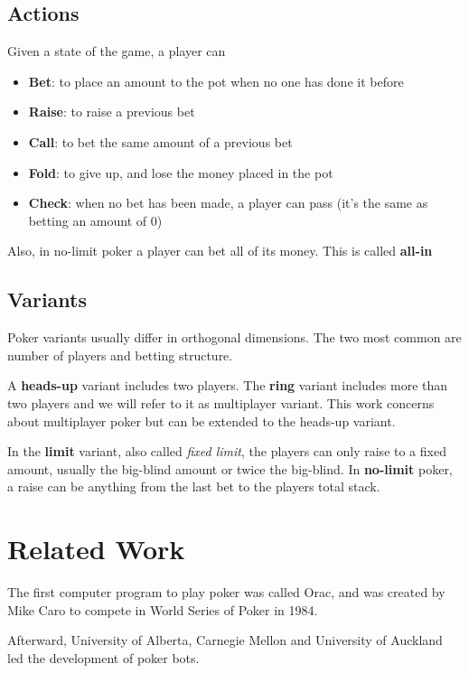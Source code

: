 \subsection{Actions}

Given a state of the game, a player can

\begin{itemize}
  \item \textbf{Bet}: to place an amount to the pot when no one has done it before
  \item \textbf{Raise}: to raise a previous bet
  \item \textbf{Call}: to bet the same amount of a previous bet
  \item \textbf{Fold}: to give up, and lose the money placed in the pot
  \item \textbf{Check}: when no bet has been made, a player can pass (it's the same as betting an amount of 0)
\end{itemize}

Also, in no-limit poker a player can bet all of its money. This is called \textbf{all-in}

\subsection{Variants}
Poker variants usually differ in orthogonal dimensions. The two most common are number of players and betting structure.

A \textbf{heads-up} variant includes two players. The \textbf{ring} variant includes more than two players and we will refer to it as multiplayer variant. This work concerns about multiplayer poker but can be extended to the heads-up variant.

In the \textbf{limit} variant, also called \textit{fixed limit}, the players can only raise to a fixed amount, usually the big-blind amount or twice the big-blind. In \textbf{no-limit} poker, a raise can be anything from the last bet to the players total stack.

\section{Related Work}
\label{chap:related-work}

The first computer program to play poker was called Orac, and was created by Mike Caro to compete in World Series of Poker in 1984.

Afterward, University of Alberta, Carnegie Mellon and University of Auckland led the development of poker bots.

